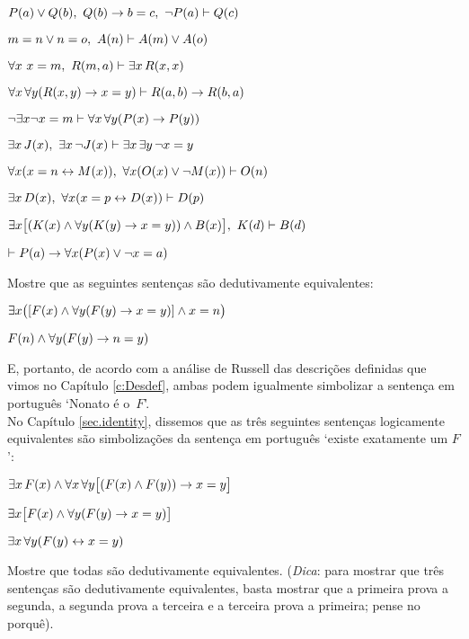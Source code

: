 \begin{earg}
\item $\mathord{P}(a) \vee \mathord{Q}(b),\,\, \mathord{Q}(b) \rightarrow b=c,\,\, \neg\mathord{P}(a) \vdash \mathord{Q}(c)$
\item $m=n \vee n=o,\,\, \mathord{A}(n) \vdash \mathord{A}(m) \vee \mathord{A}(o)$
\item $\forall x\ x=m,\,\, \mathord{R}(m,a) \vdash \exists x\,\mathord{R}(x,x)$
\item $\forall x\,\forall y(\mathord{R}(x,y) \rightarrow x=y)\vdash \mathord{R}(a,b) \rightarrow \mathord{R}(b,a)$
\item $\neg \exists x\neg x = m \vdash \forall x\,\forall y (\mathord{P}(x) \rightarrow \mathord{P}(y))$
\item $\exists x\,\mathord{J}(x),\,\, \exists x\, \neg\mathord{J}(x)\vdash \exists x\, \exists y\, \neg x = y$
\item $\forall x(x=n \leftrightarrow \mathord{M}(x)),\,\, \forall x(\mathord{O}(x) \vee \neg \mathord{M}(x))\vdash \mathord{O}(n)$
\item $\exists x\,\mathord{D}(x),\,\, \forall x(x=p \leftrightarrow \mathord{D}(x))\vdash \mathord{D}(p)$
\item $\exists x\bigl[(\mathord{K}(x) \wedge \forall y(\mathord{K}(y) \rightarrow x=y)) \wedge \mathord{B}(x)\bigr],\,\, K(d)\vdash \mathord{B}(d)$
\item $\vdash \mathord{P}(a) \rightarrow \forall x(\mathord{P}(x) \vee \neg x = a)$
\end{earg}

\problempart
Mostre que as seguintes sentenças são dedutivamente equivalentes:
\begin{ebullet}
\item $\exists x \bigl([\mathord{F}(x) \wedge \forall y (\mathord{F}(y) \rightarrow x = y)] \wedge x = n\bigr)$
\item $\mathord{F}(n) \wedge \forall y (\mathord{F}(y) \rightarrow n= y)$
\end{ebullet}

E, portanto, de acordo com a análise de Russell das descrições definidas que vimos no Capítulo \ref{c:Desdef}, ambas podem igualmente simbolizar a sentença em português `Nonato é o~$F$'.\\

\problempart
No Capítulo   \ref{sec.identity}, dissemos que as três seguintes sentenças logicamente equivalentes  são simbolizações da sentença em português `existe exatamente um $F$':
\begin{ebullet}
\item $\exists x\,\mathord{F}(x) \wedge \forall x\, \forall y \bigl[(\mathord{F}(x) \wedge \mathord{F}(y)) \rightarrow x = y\bigr]$
\item $\exists x \bigl[\mathord{F}(x) \wedge \forall y (\mathord{F}(y) \rightarrow x = y)\bigr]$
\item $\exists x\, \forall y (\mathord{F}(y) \leftrightarrow x = y)$
\end{ebullet}
Mostre que todas são dedutivamente equivalentes. (\emph{Dica}: para mostrar que três sentenças são dedutivamente equivalentes, basta mostrar que a  primeira  prova a segunda, a segunda prova a terceira e a terceira prova a primeira; pense no porquê).


